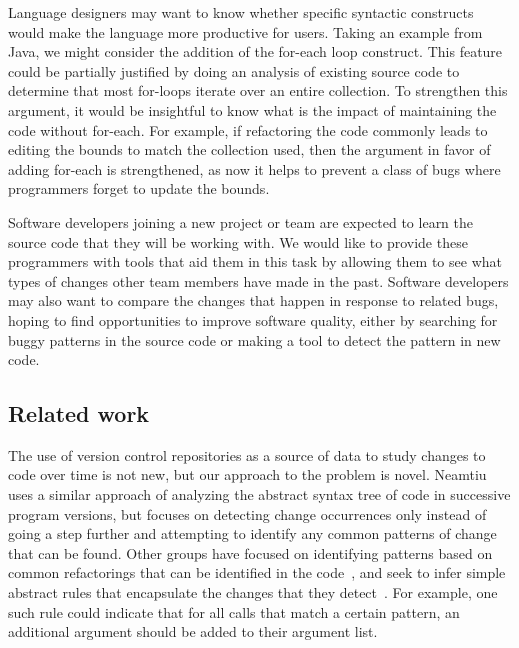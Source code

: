 
Language designers may want to know whether specific syntactic constructs would
make the language more productive for users. Taking an example from Java, we
might consider the addition of the for-each loop construct. This feature
could be partially justified by doing an analysis of existing source code to
determine that most for-loops iterate over an entire collection. To strengthen
this argument, it would be insightful to know what is the impact of maintaining
the code without for-each. For example, if refactoring the code commonly
leads to editing the bounds to match the collection used, then the argument in
favor of adding for-each is strengthened, as now it helps to prevent a
class of bugs where programmers forget to update the bounds.

Software developers joining a new project or team are expected to learn the
source code that they will be working with. We would like to provide these
programmers with tools that aid them in this task by allowing them to see what
types of changes other team members have made in the past. Software developers
may also want to compare the changes that happen in response to related bugs,
hoping to find opportunities to improve software quality, either by searching
for buggy patterns in the source code or making a tool to detect the pattern in
new code.  

\subsection{Related work}

The use of version control repositories as a source of data to study changes
to code over time is not new, but our approach to the problem is novel.
Neamtiu~\cite{neamtiu05understand} uses a similar approach of analyzing the
abstract syntax tree of code in successive program versions, but focuses on
detecting change occurrences only instead of going a step further and
attempting to identify any common patterns of change that can be found.  
Other groups have focused on identifying patterns based on common
refactorings that can be identified in the code~\cite{weissgerber06identify},
and seek to infer simple abstract rules that encapsulate the changes
that they detect~\cite{kim07automatic}.  For example, one such rule could
indicate that for all calls that match a certain pattern, an additional
argument should be added to their argument list.

